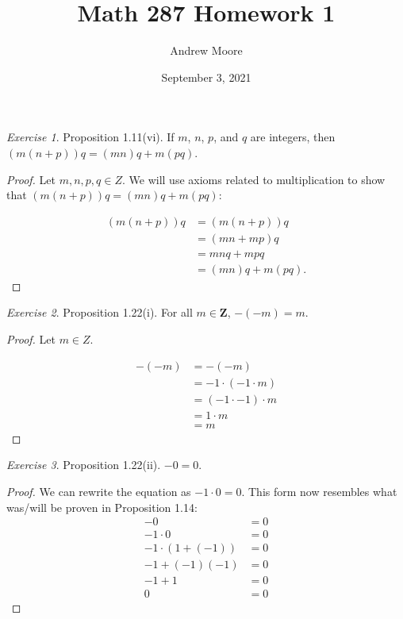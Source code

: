 \documentclass[12pt,oneside]{amsart}
\title{Math 287 Homework 1}
\author{Andrew Moore}
\date{September 3, 2021} %
\theoremstyle{remark}
\newtheorem{exer}{Exercise}
\begin{document}
\maketitle

\newpage
\begin{exer}
Proposition 1.11(vi). If $m$, $n$, $p$, and $q$ are integers, then \newline
$(m(n+p))q = (mn)q + m(pq)$.
\end{exer}

\begin{proof}
Let $m, n, p, q \in Z.$ We will use axioms related to multiplication to show that $(m(n + p))q = (mn)q + m(pq):$

\begin{align*}
(m(n + p))q &= (m(n + p))q \\
            &= (mn + mp)q \tag{Axiom 1.1.3} \\
            &= mnq + mpq \tag{Axiom 1.1.3} \\
            &= (mn)q + m(pq). \tag{Axiom 1.1.5}
\end{align*}
\end{proof}

\newpage
\begin{exer}
Proposition 1.22(i). For all $m \in \mathbf{Z}$, $-(-m) = m$.
\end{exer}

\begin{proof}
Let $m \in Z$.

\begin{align*}
-(-m) &= -(-m) \\
      &= -1 \cdot (-1 \cdot m) \\
      &= (-1 \cdot -1) \cdot m \tag{Axiom 1.1.4} \\
      &= 1 \cdot m \tag{Corollary 1.21} \\
      &= m
\end{align*}
\end{proof}

\newpage
\begin{exer}
Proposition 1.22(ii). $-0 = 0$.
\end{exer}

\begin{proof}
We can rewrite the equation as $-1 \cdot 0 = 0$. This form now resembles what was/will be proven in Proposition 1.14:
\begin{align*}
                 -0 &= 0 \\
         -1 \cdot 0 &= 0 \\
-1 \cdot (1 + (-1)) &= 0 \tag{Replacement} \\
      -1 + (-1)(-1) &= 0 \tag{Axiom 1.1.3} \\
             -1 + 1 &= 0 \\
                  0 &= 0
\end{align*}
\end{proof}
\end{document}
